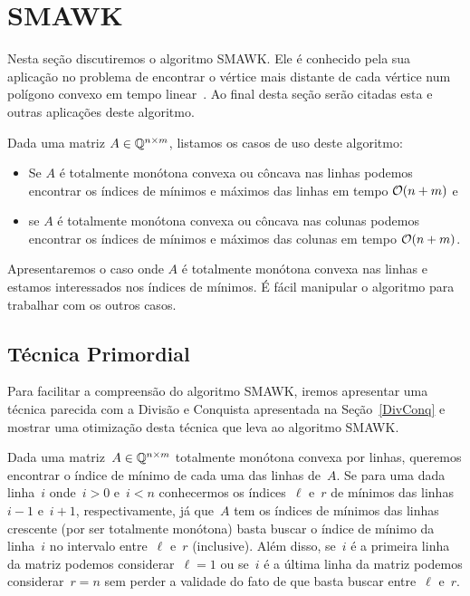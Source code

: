 \section{SMAWK}
\label{SMAWK}


Nesta seção discutiremos o algoritmo SMAWK. Ele é conhecido pela sua aplicação no problema de encontrar o vértice mais distante de cada vértice num polígono convexo em tempo linear~\cite{Aggarwal:1987}. Ao final desta seção serão citadas esta e outras aplicações deste algoritmo.  

Dada uma matriz $A \in \mathbb{Q}^{n \times m}$, listamos os casos de uso deste algoritmo:
\begin{itemize}
    \item Se $A$ é totalmente monótona convexa ou côncava nas linhas podemos encontrar os índices de mínimos e máximos das linhas em tempo $\mathcal{O}(n + m)$ e
    \item se $A$ é totalmente monótona convexa ou côncava nas colunas podemos encontrar os índices de mínimos e máximos das colunas em tempo $\mathcal{O}(n + m)$.
\end{itemize}

Apresentaremos o caso onde $A$ é totalmente monótona convexa nas linhas e estamos interessados nos índices de mínimos. É fácil manipular o algoritmo para trabalhar com os outros casos.


\subsection{Técnica Primordial} \label{SMAWK:primordial}
Para facilitar a compreensão do algoritmo SMAWK, iremos apresentar uma técnica parecida com a Divisão e Conquista apresentada na Seção~\ref{DivConq} e mostrar uma otimização desta técnica que leva ao algoritmo SMAWK.

Dada uma matriz~$A \in \mathbb{Q}^{n \times m}$ totalmente monótona convexa por linhas, queremos encontrar o índice de mínimo de cada uma das linhas de~$A$. Se para uma dada linha~$i$ onde~$i > 0$ e~$i < n$ conhecermos os índices~$\ell$ e~$r$ de mínimos das linhas~$i-1$ e~$i+1$, respectivamente, já que~$A$ tem os índices de mínimos das linhas crescente (por ser totalmente monótona) basta buscar o índice de mínimo da linha~$i$ no intervalo entre~$\ell$ e~$r$ (inclusive). Além disso, se~$i$ é a primeira linha da matriz podemos considerar~$\ell = 1$ ou se~$i$ é a última linha da matriz podemos considerar~$r = n$ sem perder a validade do fato de que basta buscar entre~$\ell$ e~$r$.  

